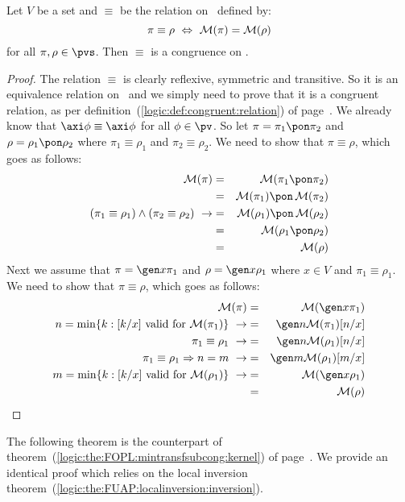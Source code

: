 \begin{prop}\label{logic:prop:FUAP:mintransfsubcong:congruence}
Let $V$ be a set and $\equiv$ be the relation on \pvs\ defined by:
    \[
    \pi\equiv\rho\ \Leftrightarrow\ {\cal M}(\pi)={\cal M}(\rho)
    \]
for all $\pi,\rho\in\pvs$. Then $\equiv$ is a congruence on \pvs.
\end{prop}
\begin{proof}
The relation $\equiv$ is clearly reflexive, symmetric and
transitive. So it is an equivalence relation on \pvs\ and we simply
need to prove that it is a congruent relation, as per
definition~(\ref{logic:def:congruent:relation}) of
page~\pageref{logic:def:congruent:relation}. We already know that
$\axi\phi\equiv\axi\phi$ for all $\phi\in\pv$. So let
$\pi=\pi_{1}\pon\pi_{2}$ and $\rho=\rho_{1}\pon\rho_{2}$ where
$\pi_{1}\equiv\rho_{1}$ and $\pi_{2}\equiv\rho_{2}$. We need to show
that $\pi\equiv\rho$, which goes as follows:
    \begin{eqnarray*}
    {\cal M}(\pi)&=&{\cal M}(\pi_{1}\pon\pi_{2})\\
    &=&{\cal M}(\pi_{1})\pon\,{\cal M}(\pi_{2})\\
    (\pi_{1}\equiv\rho_{1})\land(\pi_{2}\equiv\rho_{2})\ \rightarrow
    &=&{\cal M}(\rho_{1})\pon\,{\cal M}(\rho_{2})\\
    &=&{\cal M}(\rho_{1}\pon\rho_{2})\\
    &=&{\cal M}(\rho)
    \end{eqnarray*}
Next we assume that $\pi=\gen x\pi_{1}$ and $\rho=\gen x\rho_{1}$
where $x\in V$ and $\pi_{1}\equiv\rho_{1}$. We need to show that
$\pi\equiv\rho$, which goes as follows:
    \begin{eqnarray*}
    {\cal M}(\pi)&=&{\cal M}(\gen x\pi_{1})\\
    \mbox{$n=\min\{k:[k/x]\mbox{ valid for }{\cal M}(\pi_{1})\}$}\
    \rightarrow&=&\gen n{\cal M}(\pi_{1})[n/x]\\
    \pi_{1}\equiv\rho_{1}\ \rightarrow&=&\gen n{\cal M}(\rho_{1})[n/x]\\
    \pi_{1}\equiv\rho_{1}\Rightarrow n=m\ \rightarrow&=&\gen m{\cal M}(\rho_{1})[m/x]\\
    \mbox{$m=\min\{k:[k/x]\mbox{ valid for }{\cal M}(\rho_{1})\}$}\
    \rightarrow&=&{\cal M}(\gen x\rho_{1})\\
    &=&{\cal M}(\rho)
    \end{eqnarray*}
\end{proof}

The following theorem is the counterpart of
theorem~(\ref{logic:the:FOPL:mintransfsubcong:kernel}) of
page~\pageref{logic:the:FOPL:mintransfsubcong:kernel}. We provide an
identical proof which relies on the local inversion
theorem~(\ref{logic:the:FUAP:localinversion:inversion}).

